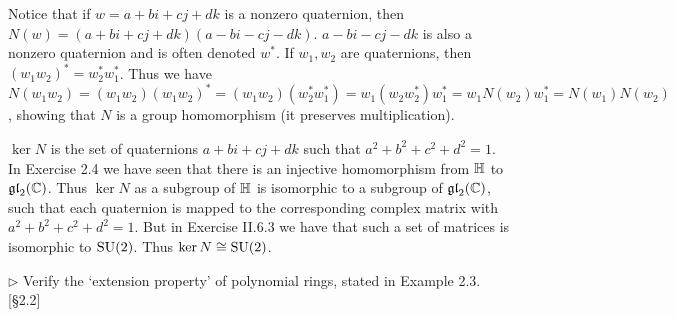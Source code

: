 \begin{solution}
	Notice that if $w = a + bi + cj + dk$ is a nonzero quaternion, then $N(w) = (a + bi + cj + dk)(a - bi - cj - dk)$. $a - bi -cj - dk$ is also a nonzero quaternion and is often denoted $w^*$. If $w_1, w_2$ are quaternions, then $(w_1 w_2)^* = w_2^* w_1^*$. Thus we have $N(w_1 w_2) = (w_1 w_2)(w_1 w_2)^* = (w_1 w_2)(w_2^* w_1^*) = w_1 (w_2 w_2^*) w_1^* = w_1 N(w_2) w_1^* = N(w_1) N(w_2)$, showing that $N$ is a group homomorphism (it preserves multiplication).
	
	$\ker N$ is the set of quaternions $a + bi + cj + dk$ such that $a^2 + b^2 + c^2 + d^2 = 1$. In Exercise 2.4 we have seen that there is an injective homomorphism from $\mathbb{H}$ to $\mathfrak{gl}_2(\mathbb{C})$. Thus $\ker N$ as a subgroup of $\mathbb{H}$ is isomorphic to a subgroup of $\mathfrak{gl}_2(\mathbb{C})$, such that each quaternion is mapped to the corresponding complex matrix with $a^2+b^2+c^2+d^2 = 1$. But in Exercise II.6.3 we have that such a set of matrices is isomorphic to $\mathrm{SU}(2)$. Thus $\ker N \cong \mathrm{SU}(2)$.
\end{solution}

\begin{problem}
	$\triangleright$ Verify the `extension property' of polynomial rings, stated in Example 2.3. [\S 2.2]
\end{problem}


